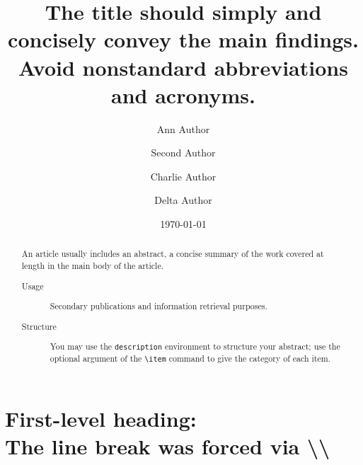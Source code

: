 \documentclass[%
 preprint, linenumbers,
 amsmath,amssymb,
 aps, physrev,
]{revtex4-2}
\begin{document}

\title{\textbf{The title should simply and concisely convey the main findings. Avoid nonstandard abbreviations and acronyms.} 
}%


\author{Ann Author}
\author{Second Author}%
%


\author{Charlie Author}
%
%
\author{Delta Author}
%


\date{\today}%

\begin{abstract}
An article usually includes an abstract, a concise summary of the work
covered at length in the main body of the article. 
\begin{description}
\item[Usage]
Secondary publications and information retrieval purposes.
\item[Structure]
You may use the \texttt{description} environment to structure your abstract;
use the optional argument of the \verb+\item+ command to give the category of each item. 
\end{description}
\end{abstract}

\maketitle


\section{\label{sec:level1}First-level heading:\protect\\ The line
break was forced \lowercase{via} \textbackslash\textbackslash}
\end{document}
